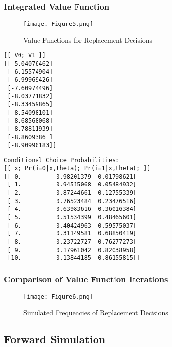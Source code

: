 \documentclass{article}
\begin{document}
\newpage

\subsubsection{Integrated Value Function}

\begin{figure}[h]
\begin{center}
\texttt{[image: Figure5.png]}
\caption{Value Functions for Replacement Decisions}
\end{center}
\end{figure}
\FloatBarrier

\begin{lstlisting}
[[ V0; V1 ]]
[[-5.04076462]
 [-6.15574904]
 [-6.99969426]
 [-7.60974496]
 [-8.03771832]
 [-8.33459865]
 [-8.54098101]
 [-8.68568068]
 [-8.78811939]
 [-8.8609386 ]
 [-8.90990183]]
\end{lstlisting}

\newpage

\begin{lstlisting}
Conditional Choice Probabilities:
[[ x; Pr(i=0|x,theta); Pr(i=1|x,theta); ]]
[[ 0.          0.98201379  0.01798621]
 [ 1.          0.94515068  0.05484932]
 [ 2.          0.87244661  0.12755339]
 [ 3.          0.76523484  0.23476516]
 [ 4.          0.63983616  0.36016384]
 [ 5.          0.51534399  0.48465601]
 [ 6.          0.40424963  0.59575037]
 [ 7.          0.31149581  0.68850419]
 [ 8.          0.23722727  0.76277273]
 [ 9.          0.17961042  0.82038958]
 [10.          0.13844185  0.86155815]]
\end{lstlisting}

\subsubsection{Comparison of Value Function Iterations}

\begin{figure}[h]
\begin{center}
\texttt{[image: Figure6.png]}
\caption{Simulated Frequencies of Replacement Decisions}
\end{center}
\end{figure}
\FloatBarrier

\newpage

\subsection{Forward Simulation}
\end{document}
